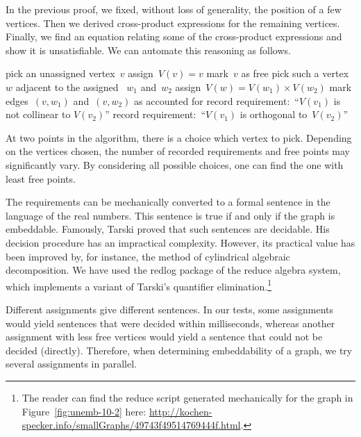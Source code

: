 \documentclass{report}
\begin{document}
In the previous proof, we fixed, without loss of generality, the position
of a few vertices.  Then we derived cross-product expressions for the
remaining vertices.  Finally, we find an equation relating some of
the cross-product expressions and show it is unsatisfiable.
We can automate this reasoning as follows.

\begin{algorithmic}[5]
        \State pick an unassigned vertex~$v$
        \State assign~$V(v)=v$ 
        \State mark~$v$ as free
            \State pick such a vertex~$w$ adjacent to the
                    assigned ~$w_1$ and~$w_2$
            \State assign~$V(w)=V(w_1) \times V(w_2)$
            \State mark edges~$(v,w_1)$ and~$(v,w_2)$ as accounted for
        \EndWhile
    \EndWhile
    \pagebreak[2]
            \State record requirement:~``$V(v_1)$
                    is not collinear to $V(v_2)$''
        \EndIf
    \EndFor
        \State record requirement:~``$V(v_1)$ is orthogonal to~$V(v_2)$''
    \EndFor
\end{algorithmic}

At two points in the algorithm, there is a choice which vertex to pick.
Depending on the vertices chosen, the number of recorded requirements
and free points may significantly vary. By considering all possible choices,
one can find the one with least free points.

The requirements can be mechanically converted
to a formal sentence
in the language of the real numbers.
This sentence is true if and only if the graph is embeddable.
Famously, Tarski proved\cite{tarski}
that such sentences are decidable.
His decision procedure has an impractical complexity.
However, its practical value has been improved
by, for instance, the method of cylindrical algebraic decomposition\cite{qecad}.
We have used the redlog\cite{redlog} package of the reduce algebra
system, which implements a variant of Tarski's quantifier
elimination.\footnote{%
    The reader can find the reduce script generated mechanically
    for the graph in Figure~\ref{fig:unemb-10-2} here:
    \url{http://kochen-specker.info/smallGraphs/49743f49514769444f.html}.  }

Different assignments give different sentences.  In our tests,
some assignments would yield sentences that were decided within milliseconds,
whereas another assignment with less free vertices would
yield a sentence that could not be decided (directly).
Therefore, when determining embeddability of a graph,
we try several assignments in parallel.
\end{document}
